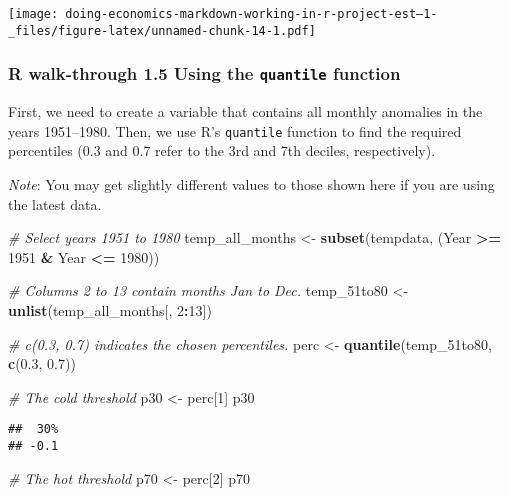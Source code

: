 \documentclass[
]{article}
\newenvironment{Shaded}{\begin{snugshade}}{\end{snugshade}}
\newcommand{\CommentTok}[1]{\textcolor[rgb]{0.56,0.35,0.01}{\textit{#1}}}
\newcommand{\DecValTok}[1]{\textcolor[rgb]{0.00,0.00,0.81}{#1}}
\newcommand{\FloatTok}[1]{\textcolor[rgb]{0.00,0.00,0.81}{#1}}
\newcommand{\FunctionTok}[1]{\textcolor[rgb]{0.13,0.29,0.53}{\textbf{#1}}}
\newcommand{\NormalTok}[1]{#1}
\newcommand{\OtherTok}[1]{\textcolor[rgb]{0.56,0.35,0.01}{#1}}
\newcommand{\SpecialCharTok}[1]{\textcolor[rgb]{0.81,0.36,0.00}{\textbf{#1}}}
\begin{document}
\texttt{[image: doing-economics-markdown-working-in-r-project-est--1-\_files/figure-latex/unnamed-chunk-14-1.pdf]}

\subsubsection{\texorpdfstring{R walk-through 1.5 Using the
\texttt{quantile}
function}{R walk-through 1.5 Using the quantile function}}\label{r-walk-through-1.5-using-the-quantile-function}

First, we need to create a variable that contains all monthly anomalies
in the years 1951--1980. Then, we use R's \texttt{quantile} function to
find the required percentiles (0.3 and 0.7 refer to the 3rd and 7th
deciles, respectively).

\emph{Note}: You may get slightly different values to those shown here
if you are using the latest data.

\begin{Shaded}
\begin{Highlighting}[]
\CommentTok{\# Select years 1951 to 1980}
\NormalTok{temp\_all\_months }\OtherTok{\textless{}{-}} \FunctionTok{subset}\NormalTok{(tempdata, }
\NormalTok{  (Year }\SpecialCharTok{\textgreater{}=} \DecValTok{1951} \SpecialCharTok{\&}\NormalTok{ Year }\SpecialCharTok{\textless{}=} \DecValTok{1980}\NormalTok{))}
                   
\CommentTok{\# Columns 2 to 13 contain months Jan to Dec.}
\NormalTok{temp\_51to80 }\OtherTok{\textless{}{-}} \FunctionTok{unlist}\NormalTok{(temp\_all\_months[, }\DecValTok{2}\SpecialCharTok{:}\DecValTok{13}\NormalTok{])}
      
\CommentTok{\# c(0.3, 0.7) indicates the chosen percentiles.}
\NormalTok{perc }\OtherTok{\textless{}{-}} \FunctionTok{quantile}\NormalTok{(temp\_51to80, }\FunctionTok{c}\NormalTok{(}\FloatTok{0.3}\NormalTok{, }\FloatTok{0.7}\NormalTok{))   }

\CommentTok{\# The cold threshold}
\NormalTok{p30 }\OtherTok{\textless{}{-}}\NormalTok{ perc[}\DecValTok{1}\NormalTok{]}
\NormalTok{p30}
\end{Highlighting}
\end{Shaded}

\begin{verbatim}
##  30% 
## -0.1
\end{verbatim}

\begin{Shaded}
\begin{Highlighting}[]
\CommentTok{\# The hot threshold}
\NormalTok{p70 }\OtherTok{\textless{}{-}}\NormalTok{ perc[}\DecValTok{2}\NormalTok{]}
\NormalTok{p70}
\end{Highlighting}
\end{Shaded}
\end{document}
